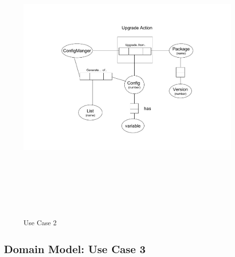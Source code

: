 \begin{figure}[htbp]
  \centering
  \includegraphics[angle=0,width=15cm,height=15cm]{"domainmodel-usecase2"}
  \caption{Use Case 2}
  \label{fig:usecase2}
\end{figure}

\newpage
\subsection{Domain Model: Use Case 3}


